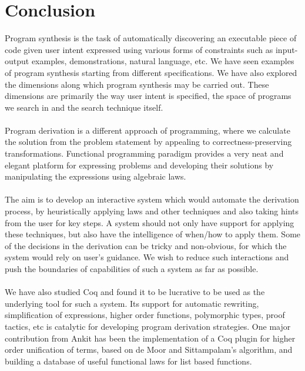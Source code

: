 \chapter{Conclusion}

Program synthesis is the task of automatically discovering an executable piece of code given user intent expressed using various forms of constraints such as input-output examples, demonstrations, natural language, etc. We have seen examples of program synthesis starting from different specifications. We have also explored the dimensions along which program synthesis may be carried out. These dimensions are primarily the way user intent is specified, the space of programs we search in and the search technique itself. \\\\
Program derivation is a different approach of programming, where we calculate the solution from the problem statement by appealing to correctness-preserving transformations. Functional programming paradigm provides a very neat and elegant platform for expressing problems and developing their solutions by manipulating the expressions using algebraic laws. \\\\
The aim is to develop an interactive system which would automate the derivation process, by heuristically applying laws and other techniques and also taking hints from the user for key steps. A system should not only have support for applying these techniques, but also have the intelligence of when/how to apply them. Some of the decisions in the derivation can be tricky and non-obvious, for which the system would rely on user’s guidance. We wish to reduce such interactions and push the boundaries of capabilities of such a system as far as possible. \\\\
We have also studied Coq and found it to be lucrative to be used as the underlying tool for such a system. Its support for automatic rewriting, simplification of expressions, higher order functions, polymorphic types, proof tactics, etc is catalytic for developing program derivation strategies. One major contribution from Ankit has been the implementation of a Coq plugin for higher order unification of terms, based on de Moor and Sittampalam's algorithm, and building a database of useful functional laws for list based functions. \\\\
